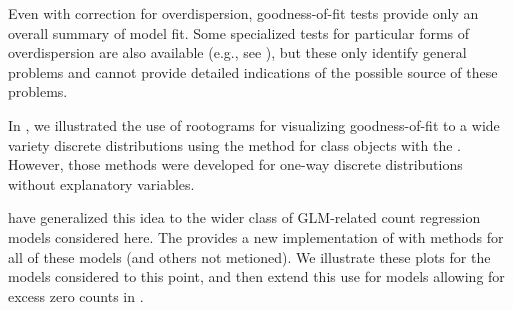 \documentclass[11pt]{book}\usepackage[]{graphicx}\usepackage[]{color}
\begin{document}
Even with correction for overdispersion, goodness-of-fit tests provide only an overall
summary of model fit.  Some specialized tests for particular forms of overdispersion
are also available (e.g., see \citet[]{CameronTrivedi:1998}),
but these only identify general problems and cannot provide detailed indications of
the possible source of these problems.

In , we illustrated the use of rootograms for visualizing goodness-of-fit
to a wide variety discrete distributions using the  method for
class  objects with the .  However, those methods were
developed for one-way discrete distributions without explanatory variables.

\citet{KleiberZeileis:2014} have generalized this idea to the wider class of 
GLM-related count regression models considered here.
The  provides a new implementation of 
with methods for all of these models (and others not metioned).
We illustrate these plots for the models considered to this point, and then extend
this use for models allowing for excess zero counts in .
\end{document}
